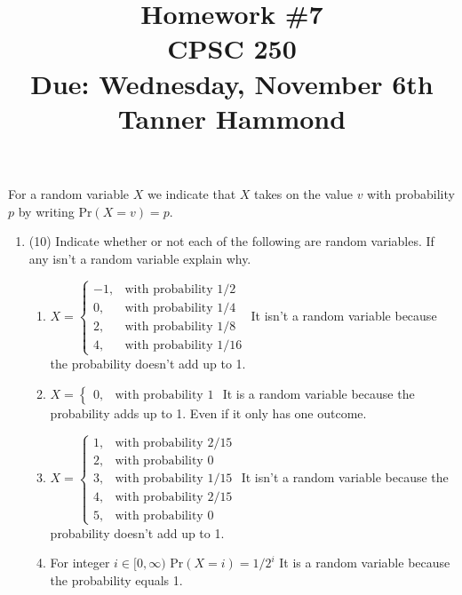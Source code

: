 \documentclass[12pt]{article}
\begin{document}

\title{Homework \#7 \\ CPSC 250 \\ Due: Wednesday, November 6th \\ Tanner Hammond}%
\date{}

\maketitle

For a random variable $X$ we indicate that $X$ takes on the value $v$ with probability $p$ by writing Pr$(X = v) = p$.

\begin{enumerate}
\item (10)
Indicate whether or not each of the following are random variables. If any isn't a random variable explain why.
\begin{enumerate}
 \item $X = \begin{cases}
       -1, &\textrm{with probability }1/2 \\
       0, &\textrm{with probability }1/4 \\
       2, &\textrm{with probability }1/8 \\
       4, &\textrm{with probability }1/16
       \end{cases}$\newline
It isn't a random variable because the probability doesn't add up to 1.       
       
       
 \item $X = \begin{cases}
       0, &\textrm{with probability }1
       \end{cases}$ \newline
It is a random variable because the probability adds up to 1. Even if it only has one outcome.
       
 \item $X = \begin{cases}
       1, &\textrm{with probability }2/15 \\
       2, &\textrm{with probability }0 \\
       3, &\textrm{with probability }1/15 \\
       4, &\textrm{with probability }2/15 \\
       5, &\textrm{with probability }0
       \end{cases}$ \newline
It isn't a random variable because the probability doesn't add up to 1.
 \item For integer $i \in [0, \infty)$ Pr$(X = i) = 1/2^i$ \newline
It is a random variable because the probability equals 1.
 

\end{enumerate}
\end{enumerate}
\end{document}
